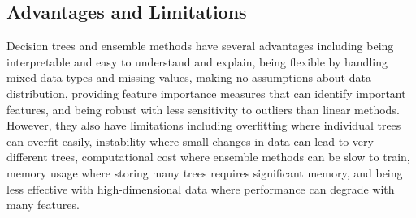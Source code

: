 \subsection{Advantages and Limitations}

Decision trees and ensemble methods have several advantages including being interpretable and easy to understand and explain, being flexible by handling mixed data types and missing values, making no assumptions about data distribution, providing feature importance measures that can identify important features, and being robust with less sensitivity to outliers than linear methods. However, they also have limitations including overfitting where individual trees can overfit easily, instability where small changes in data can lead to very different trees, computational cost where ensemble methods can be slow to train, memory usage where storing many trees requires significant memory, and being less effective with high-dimensional data where performance can degrade with many features.

